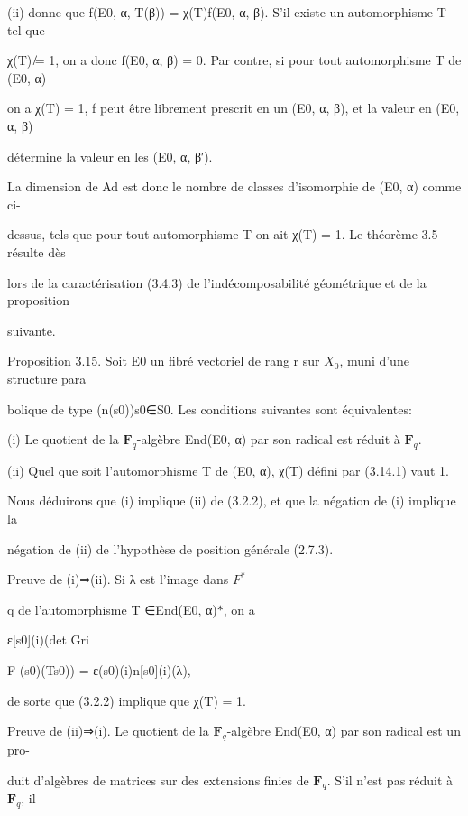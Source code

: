 \documentclass[11pt]{article}
\begin{document}
\noindent (ii) donne que f(E0, α, T(β)) = χ(T)f(E0, α, β). S’il existe un automorphisme T tel que\par
\noindent χ(T) ̸= 1, on a donc f(E0, α, β) = 0. Par contre, si pour tout automorphisme T de (E0, α)\par
\noindent on a χ(T) = 1, f peut être librement prescrit en un (E0, α, β), et la valeur en (E0, α, β)\par
\noindent détermine la valeur en les (E0, α, β′).\par
\noindent La dimension de Ad est donc le nombre de classes d’isomorphie de (E0, α) comme ci-\par
\noindent dessus, tels que pour tout automorphisme T on ait χ(T) = 1. Le théorème 3.5 résulte dès\par
\noindent lors de la caractérisation (3.4.3) de l’indécomposabilité géométrique et de la proposition\par
\noindent suivante.\par
\noindent Proposition 3.15. Soit E0 un fibré vectoriel de rang r sur \(X_0\), muni d’une structure para\par
\noindent bolique de type (n(s0))s0∈S0. Les conditions suivantes sont équivalentes:\par
\noindent (i) Le quotient de la \(\mathbf F_q\)-algèbre End(E0, α) par son radical est réduit à \(\mathbf F_q\).\par
\noindent (ii) Quel que soit l’automorphisme T de (E0, α), χ(T) défini par (3.14.1) vaut 1.\par
\noindent Nous déduirons que (i) implique (ii) de (3.2.2), et que la négation de (i) implique la\par
\noindent négation de (ii) de l’hypothèse de position générale (2.7.3).\par
\noindent Preuve de (i)⇒(ii). Si λ est l’image dans \(F^*\)\par
\noindent q de l’automorphisme T ∈End(E0, α)\(*\), on a\par
\noindent ε[s0](i)(det Gri\par
\noindent F (s0)(Ts0)) = ε(s0)(i)n[s0](i)(λ),\par
\noindent de sorte que (3.2.2) implique que χ(T) = 1.\par
\noindent Preuve de (ii)⇒(i). Le quotient de la \(\mathbf F_q\)-algèbre End(E0, α) par son radical est un pro-\par
\noindent duit d’algèbres de matrices sur des extensions finies de \(\mathbf F_q\). S’il n’est pas réduit à \(\mathbf F_q\), il\par
\end{document}

